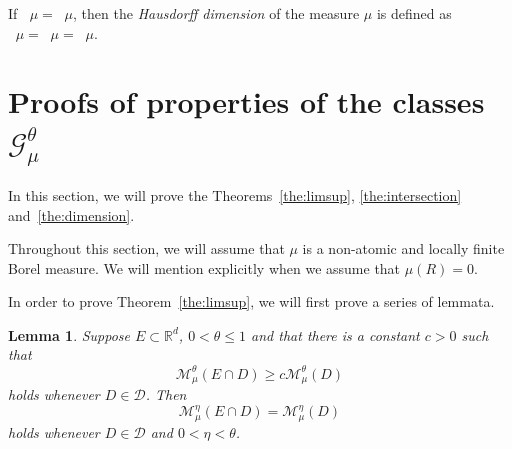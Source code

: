 \documentclass[11pt]{article}
\newtheorem{lemm}[theo]{Lemma}
\theoremstyle{definition}
\numberwithin{equation}{section}
\numberwithin{figure}{section}
\numberwithin{table}{section}
\DeclareMathOperator{\dimh}{dim_H}
\DeclareMathOperator{\ldimh}{\underline{dim}_H}
\DeclareMathOperator{\udimh}{\overline{dim}_H}
\begin{document}
If $\ldimh \mu = \udimh \mu$, then the {\em Hausdorff dimension} of the measure $\mu$ is defined as $\dimh \mu = \ldimh \mu = \udimh \mu$.


\section{Proofs of properties of the classes \texorpdfstring{$\mathscr{G}_\mu^\theta$}{}} \label{sec:propertiesproofs}

In this section, we will prove the Theorems~\ref{the:limsup}, \ref{the:intersection} and~\ref{the:dimension}.

Throughout this section, we will assume that $\mu$ is a non-atomic and locally finite Borel measure. We will mention explicitly when we assume that $\mu (R) = 0$.

In order to prove Theorem~\ref{the:limsup}, we will first prove a series of lemmata.

\begin{lemm}\label{lem:removec}
Suppose $E \subset \mathbb{R}^d$, $0 < \theta \leq 1$ and that there is a constant $c > 0$ such that
\[
\mathscr{M}_\mu^\theta (E \cap D) \geq c \mathscr{M}_\mu^\theta (D)
\]
holds whenever $D \in \mathscr{D}$. Then
\[
\mathscr{M}_\mu^\eta (E \cap D) = \mathscr{M}_\mu^\eta (D)
\]
holds whenever $D \in \mathscr{D}$ and $0 < \eta < \theta$.
\end{lemm}
\end{document}
